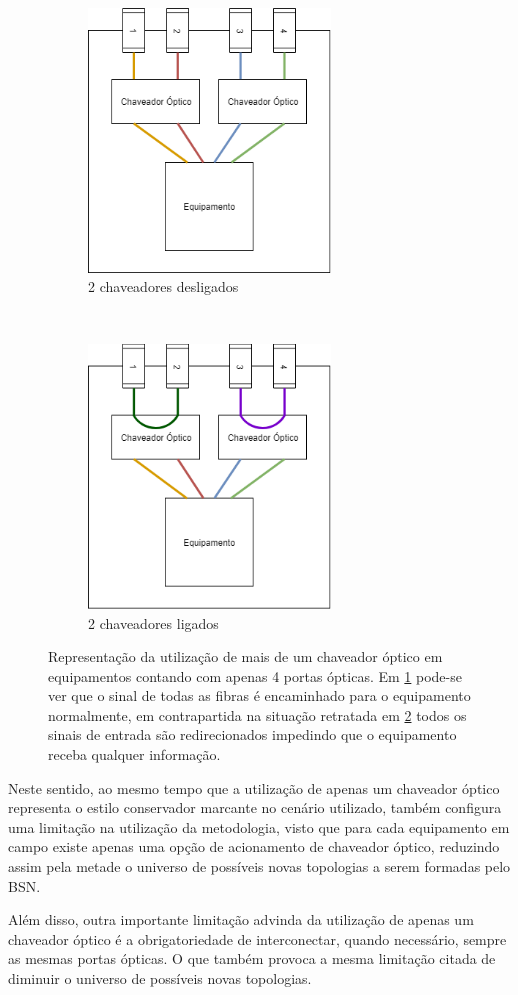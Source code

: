 \begin{figure}[t!]
	\centering
	\begin{subfigure}[t]{0.4\textwidth}
		\centering
		\includegraphics[height=7cm]{./figuras/2-opt-sw-off.png} %
		\caption{2 chaveadores desligados}
		\label{fig_2optsw_off}
	\end{subfigure}%
	~
	\begin{subfigure}[t]{0.4\textwidth}
		\centering
		\includegraphics[height=7cm]{./figuras/2-opt-sw-on.png} %
	\caption{2 chaveadores ligados}
	\label{fig_2optsw_on}
	\end{subfigure}
	\caption[Multiplicidade de chaveadores ópticos]{Representação da utilização de mais de um chaveador óptico em equipamentos contando com apenas 4 portas ópticas. Em \ref{fig_2optsw_off} pode-se ver que o sinal de todas as fibras é encaminhado para o equipamento normalmente, em contrapartida na situação retratada em \ref{fig_2optsw_on} todos os sinais de entrada são redirecionados impedindo que o equipamento receba qualquer informação.}
	\label{fig_2optsw}
\end{figure}

Neste sentido, ao mesmo tempo que a utilização de apenas um chaveador óptico representa o estilo conservador marcante no cenário utilizado, também configura uma limitação na utilização da metodologia, visto que para cada equipamento em campo existe apenas uma opção de acionamento de chaveador óptico, reduzindo assim pela metade o universo de possíveis novas topologias a serem formadas pelo BSN.

Além disso, outra importante limitação advinda da utilização de apenas um chaveador óptico é a obrigatoriedade de interconectar, quando necessário, sempre as mesmas portas ópticas. O que também provoca a mesma limitação citada de diminuir o universo de possíveis novas topologias.